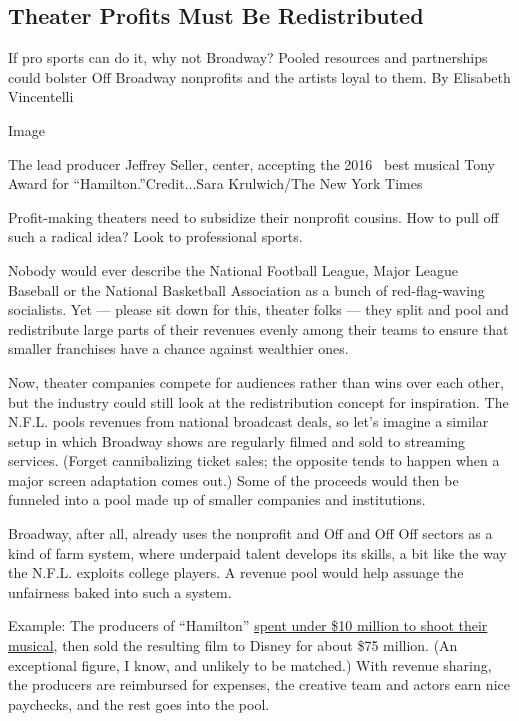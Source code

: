 \hypertarget{theater-profits-must-be-redistributed}{%
\subsection{Theater Profits Must Be
Redistributed}\label{theater-profits-must-be-redistributed}}

If pro sports can do it, why not Broadway? Pooled resources and
partnerships could bolster Off Broadway nonprofits and the artists loyal
to them. By Elisabeth Vincentelli

Image

The lead producer Jeffrey Seller, center, accepting the 2016~ best
musical Tony Award for ``Hamilton.''Credit...Sara Krulwich/The New York
Times

Profit-making theaters need to subsidize their nonprofit cousins. How to
pull off such a radical idea? Look to professional sports.

Nobody would ever describe the National Football League, Major League
Baseball or the National Basketball Association as a bunch of
red-flag-waving socialists. Yet --- please sit down for this, theater
folks --- they split and pool and redistribute large parts of their
revenues evenly among their teams to ensure that smaller franchises have
a chance against wealthier ones.

Now, theater companies compete for audiences rather than wins over each
other, but the industry could still look at the redistribution concept
for inspiration. The N.F.L. pools revenues from national broadcast
deals, so let's imagine a similar setup in which Broadway shows are
regularly filmed and sold to streaming services. (Forget cannibalizing
ticket sales; the opposite tends to happen when a major screen
adaptation comes out.) Some of the proceeds would then be funneled into
a pool made up of smaller companies and institutions.

Broadway, after all, already uses the nonprofit and Off and Off Off
sectors as a kind of farm system, where underpaid talent develops its
skills, a bit like the way the N.F.L. exploits college players. A
revenue pool would help assuage the unfairness baked into such a system.

Example: The producers of ``Hamilton''
\href{https://www.nytimes3xbfgragh.onion/2020/06/25/movies/hamilton-movie-disney-streaming.html}{spent
under \$10 million to shoot their musical}, then sold the resulting film
to Disney for about \$75 million. (An exceptional figure, I know, and
unlikely to be matched.) With revenue sharing, the producers are
reimbursed for expenses, the creative team and actors earn nice
paychecks, and the rest goes into the pool.

